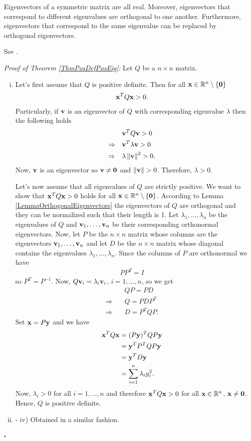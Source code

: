\documentclass[a4paper,12pt,twoside,BCOR=10mm]{scrbook}
\begin{document}
\begin{lemma}\label{LemmaOrthogonalEigenvectors}
Eigenvectors of a symmetric matrix are all real. Moreover, eigenvectors that correspond to different eigenvalues are orthogonal to one another. Furthermore, eigenvectors that correspond to the same eigenvalue can be replaced by orthogonal eigenvectors.
\end{lemma}

See \citep{peressini1988mathematics}.

\textit{Proof of Theorem \ref{ThmPosDefPosEig}:}
Let $Q$ be a $n \times n$ matrix.
\begin{enumerate}[i)]
    \item
    Let's first assume that $Q$ is positive definite. Then for all $\mathbf{x} \in \mathbb{R}^{n}\setminus\{\mathbf{0}\}$
\begin{align*}
    \mathbf{x}^T Q \mathbf{x} > 0.
\end{align*}
Particularly, if $\mathbf{v}$ is an eigenvector of $Q$ with corresponding eigenvalue $\lambda$ then the following holds
\begin{align*}
    &\mathbf{v}^T Q \mathbf{v} > 0\\
    \Rightarrow\quad& \mathbf{v}^T \lambda \mathbf{v} > 0\\
    \Rightarrow\quad& \lambda \left\lVert\mathbf{v}\right\rVert^2 > 0.
\end{align*}
Now, $\mathbf{v}$ is an eigenvector so $\mathbf{v} \neq \mathbf{0}$ and $\left\lVert\mathbf{v}\right\rVert > 0$. Therefore, $\lambda > 0$.

Let's now assume that all eigenvalues of $Q$ are strictly positive. We want to show that $\mathbf{x}^T Q \mathbf{x} > 0$ holds for all $\mathbf{x} \in \mathbb{R}^{n}\setminus \{\mathbf{0}\}$. According to Lemma \ref{LemmaOrthogonalEigenvectors} the eigenvectors of $Q$ are orthogonal and they can be normalized such that their length is 1. Let $\lambda_1, \ldots, \lambda_n$ be the eigenvalues of $Q$ and $\mathbf{v}_1, \ldots, \mathbf{v}_n$ be their corresponding orthonormal eigenvectors. Now, let $P$ be the $n\times n$ matrix whose columns are the eigenvectors $\mathbf{v}_1, \ldots, \mathbf{v}_n$ and let $D$ be the $n\times n$ matrix whose diagonal contains the eigenvalues $\lambda_1, \ldots, \lambda_n$. Since the columns of $P$ are orthonormal we have
\begin{align*}
    PP^T = I
\end{align*}
so $P^T = P^{-1}$. Now, $Q\mathbf{v}_i = \lambda_i \mathbf{v}_i$, $i = 1, \ldots, n$, so we get
\begin{align*}
    &QP = PD\\
    \Rightarrow\quad&Q = PDP^T\\
    \Rightarrow\quad&D = P^TQP.
\end{align*}
Set $\mathbf{x} = P\mathbf{y}$ and we have
\begin{align*}
    \mathbf{x}^T Q \mathbf{x} &= (P\mathbf{y})^TQP\mathbf{y}\\
    &= \mathbf{y}^T P^T Q P \mathbf{y}\\
    &= \mathbf{y}^T D \mathbf{y}\\
    &= \sum_{i = 1}^n \lambda_i y_i^2.
\end{align*}
Now, $\lambda_i > 0$ for all $i = 1, \ldots, n$ and therefore $\mathbf{x}^T Q \mathbf{x} > 0$ for all $\mathbf{x} \in \mathbb{R}^{n}$, $\mathbf{x} \neq \mathbf{0}$. Hence, $Q$ is positive definite.
\item - iv) Obtained in a similar fashion.
\end{enumerate}
\hfill $\square$
\end{document}
